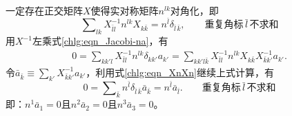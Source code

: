 一定存在{\kaishu 正交矩阵}$X$使得实对称矩阵$n^{lk}$对角化\cite[p.289]{qiuws-2018-v1}，即
\begin{equation}\label{chlg:eqn_XnXn}
	\sum\nolimits_{l k}X^{-1}_{\bar{l} l} n^{lk} X_{k \bar{k}}= n^{\bar{l}} \delta_{\bar{l}\, \bar{k}},
	\qquad \text{重复角标}\,\bar{l}\,\text{不求和}
\end{equation}
用$X^{-1}$左乘式\eqref{chlg:eqn_Jacobi-na}，有
\begin{align*}
	0= \sum\nolimits_{kk'l} X^{-1}_{\bar{l} l} n^{lk} \delta_{k k'} a_{k'}
	=\sum\nolimits_{kk'l\bar{k}} X^{-1}_{\bar{l} l} n^{lk} X_{k \bar{k}}  X^{-1}_{\bar{k} k'} a_{k'} .
\end{align*}
令$\bar{a}_{\bar{k}} \equiv \sum_{k'}X^{-1}_{\bar{k} k'} a_{k'}$，利用式\eqref{chlg:eqn_XnXn}继续上式计算，有
\begin{equation}\label{chlg:eqn_Dnakb}
	0=\sum\nolimits_{\bar{k}} n^{\bar{l}} \delta_{\bar{l}\, \bar{k}}  \bar{a}_{\bar{k}}
	= n^{\bar{l}} \bar{a}_{\bar{l}}. 	\qquad \text{重复角标}\,\bar{l}\,\text{不求和}
\end{equation}
即：$n^1 \bar{a}_1 = 0$且$n^2 \bar{a}_2 = 0$且$n^3 \bar{a}_3 = 0$。

